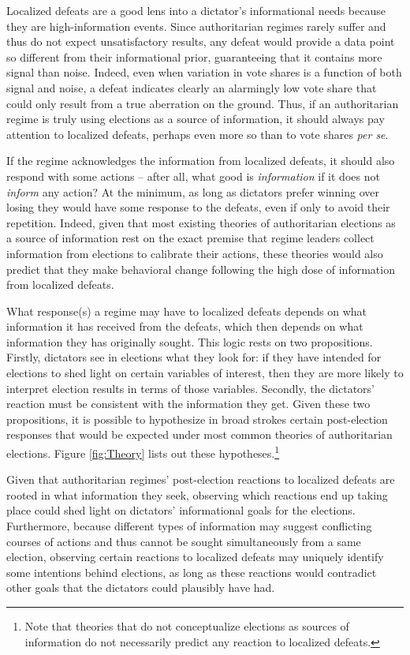 \documentclass[12pt]{article}
\newcommand\fnote[1]{\footnote{\baselineskip=2\normalbaselineskip#1}}
\newcommand{\1}{\mathbbm{1}}
\begin{document}
Localized defeats are a good lens into a dictator's informational needs because they are high-information events. Since authoritarian regimes rarely suffer and thus do not expect unsatisfactory results, any defeat would provide a data point so different from their informational prior, guaranteeing that it contains more signal than noise. Indeed, even when variation in vote shares is a function of both signal and noise, a defeat indicates clearly an alarmingly low vote share that could only result from a true aberration on the ground. Thus, if an authoritarian regime is truly using elections as a source of information, it should always pay attention to localized defeats, perhaps even more so than to vote shares \textit{per se}. 

If the regime acknowledges the information from localized defeats, it should also respond with some actions -- after all, what good is \textit{information} if it does not \textit{inform} any action? At the minimum, as long as dictators prefer winning over losing they would have some response to the defeats, even if only to avoid their repetition. Indeed, given that most existing theories of authoritarian elections as a source of information rest on the exact premise that regime leaders collect information from elections to calibrate their actions, these theories would also predict that they make behavioral change following the high dose of information from localized defeats. 

What response(s) a regime may have to localized defeats depends on what information it has received from the defeats, which then depends on what information they has originally sought. This logic rests on two propositions. Firstly, dictators see in elections what they look for: if they have intended for elections to shed light on certain variables of interest, then they are more likely to interpret election results in terms of those variables. Secondly, the dictators' reaction must be consistent with the information they get. Given these two propositions, it is possible to hypothesize in broad strokes certain post-election responses that would be expected under most common theories of authoritarian elections. Figure \ref{fig:Theory} lists out these hypotheses.\fnote{Note that theories that do not conceptualize elections as sources of information \citep[e.g][]{AR2005, Cox2009} do not necessarily predict any reaction to localized defeats.}

Given that authoritarian regimes' post-election reactions to localized defeats are rooted in what information they seek, observing which reactions end up taking place could shed light on dictators' informational goals for the elections. Furthermore, because different types of information may suggest conflicting courses of actions and thus cannot be sought simultaneously from a same election, observing certain reactions to localized defeats may uniquely identify some intentions behind elections, as long as these reactions would contradict other goals that the dictators could plausibly have had.
\end{document}
